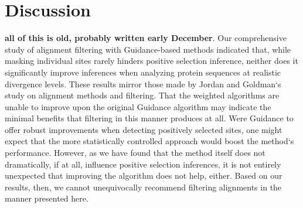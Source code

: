 \documentclass[10pt]{article}
\begin{document}
























\section*{Discussion}

\textbf{all of this is old, probably written early December}.
Our comprehensive study of alignment filtering with Guidance-based methods indicated that, while masking individual sites rarely hinders positive selection inference, neither does it significantly improve inferences when analyzing protein sequences at realistic divergence levels. These results mirror those made by Jordan and Goldman`s \citep{Jordan2011} study on alignment methods and filtering. That the weighted algorithms are unable to improve upon the original Guidance algorithm may indicate the minimal benefits that filtering in this manner produces at all. Were Guidance to offer robust improvements when detecting positively selected sites, one might expect that the more statistically controlled approach would boost the method`s performance. However, as we have found that the method itself does not dramatically, if at all, influence positive selection inferences, it is not entirely unexpected that improving the algorithm does not help, either. Based on our results, then, we cannot unequivocally recommend filtering alignments in the manner presented here. 
\end{document}
